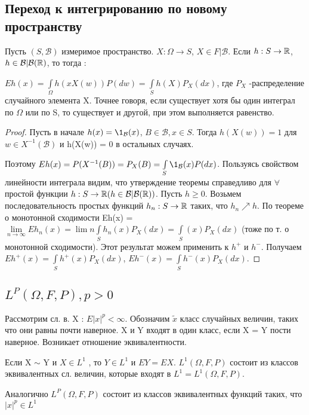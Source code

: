 	\subsection{Переход к интегрированию по новому пространству}
	
	\begin{theorem}\label{lect8:th4}
	Пусть $(S,\mathcal{B})$ измеримое пространство. $X : \Omega \to S$, $X \in F|\mathcal{B}$. Если $h : S \to \mathbb{R}$, $h \in \mathcal{B}|\mathcal{B}(\mathbb{R})$, то 
	тогда :
	 
	$Eh(x) = \int\limits_{\Omega} h(xX(w))P(dw) = \int\limits_{S}h(X)P_X(dx)$, где $P_X$ -распределение случайного элемента X. Точнее говоря, если существует хотя бы один интеграл  по $\Omega$ или по S, то существует и другой, при этом выполняется равенство.
	\end{theorem}	
	\begin{proof}
		Пусть в начале $h(x) = \1_{\mathcal{B}} (x)$, $B \in \mathcal{B}, x \in S$. Тогда $h(X(w)) = 1$ для $w \in X^{-1}(\mathcal{B})$ и h(X(w)) = 0 в остальных случаях. 
		 
		Поэтому $Eh(x) = P(X^{-1}(B)) = P_X(B)= \int\limits_{S} \1_{\mathcal{B}}(x)P(dx)$. Пользуясь свойством линейности интеграла видим, что утверждение теоремы справедливо для $\forall$ простой функции $h : S \to \mathbb{R} (h \in \mathcal{B}|\mathcal{B}(\mathbb{R}))$.
		Пусть $h \ge 0$. Возьмем последовательность простых функций $h_n : S \to \mathbb{R}$ таких, что $h_n \nearrow h$. По теореме о монотонной сходимости Eh(x) = $\lim\limits_{n \to \infty} Eh_n(x) = \lim\limits{n} \int\limits_{S} h_n(x)P_X(dx) = \int\limits_{S}  (x)P_X(dx)$ (тоже по т. о монотонной сходимости). Этот результат можем применить к $h^+$ и $h^-$. Получаем $Eh^+(x) = \int\limits_{S} h^+(x)P_X(dx)$,  $Eh^-(x) = \int\limits_{S} h^-(x)P_X(dx)$.   
	\end{proof}	
	
	\subsection{$L^P(\Omega, F, P), p > 0$}
	Рассмотрим сл. в. X : $E|x|^p < \infty$. Обозначим $\tilde{x}$ класс случайных величин, таких что они равны почти наверное. X и Y входят в один класс, если X = Y пости наверное. Возникает отношение эквивалентности.
	 
	Если X $\sim$ Y и $X \in L^1$ , то $Y \in L^1 $ и $EY = EX$.
	$L^1(\Omega, F, P)$ состоит из классов эквивалентных сл. величин, которые входят в $L^1 = L^1(\Omega, F, P)$.
	 
	Аналогично $L^P(\Omega, F, P)$ состоит из классов эквивалентных функций таких, что $|x|^p \in L^1$
	 
